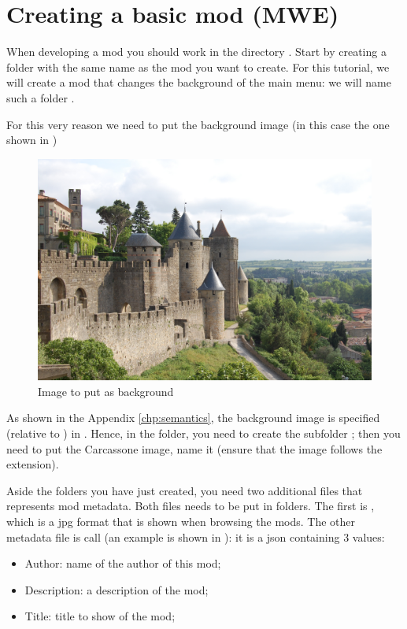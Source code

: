 \chapter{Creating a basic mod (MWE)}

When developing a mod you should work in the directory \aoehomelocaldir{}.
Start by creating a folder with the same name as the mod you want to create. For this tutorial, we will create a mod that changes the background of the main menu: we will name such a folder .

For this very reason we need to put the background image (in this case the one shown in )

\begin{figure}[ht]
    \centering
    \includegraphics[width=1.0\textwidth]{src/images/carcassonne}
    \caption{Image to put as background}
    \label{fig:carcassonne}
\end{figure}

As shown in the Appendix \ref{chp:semantics}, the background image is specified (relative to \aoeexedir{}) in .
Hence, in the  folder, you need to create the subfolder ; then you need to put the Carcassone image, name it  (ensure that the image follows the  extension).



Aside the folders you have just created, you need two additional files that represents mod metadata. Both files needs to be put in  folders. The first is , which is a jpg format that is shown when browsing the mods. The other metadata file is call  (an example is shown in ): it is a json containing 3 values:
\begin{itemize}
    \item Author: name of the author of this mod;
    \item Description: a description of the mod;
    \item Title: title to show of the mod;
\end{itemize}

